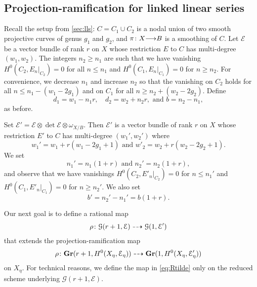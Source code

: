 \documentclass[11pt,reqno]{amsart}
\theoremstyle{plain}
\theoremstyle{definition}
\theoremstyle{remark}
\numberwithin{equation}{section}
\renewcommand{\to}{{\longrightarrow}}
\numberwithin{equation}{section}
\begin{document}
\subsection{Projection-ramification for linked linear series}
\label{sec:prlls}
Recall the setup from \autoref{sec:lls}: $C = C_1 \cup C_2$ is a nodal union of two smooth projective curves of genus $g_1$ and $g_2$, and $\pi \from X \to B$ is a smoothing of $C$.
Let $\mathcal E$ be a vector bundle of rank $r$ on $X$ whose restriction $E$ to $C$ has multi-degree $(w_1, w_2)$.
The integers $n_2 \geq n_1$ are such that we have vanishing $H^0(C_2, E_n|_{C_2}) = 0$ for all $n \leq n_1$ and $H^0(C_1, E_n|_{C_1}) = 0$ for $n \geq n_2$.
For convenience, we decrease $n_1$ and increase $n_2$ so that the vanishing on $C_2$ holds for all $n \leq n_1 - (w_1-2g_1)$ and on $C_1$ for all $n \geq n_2 + (w_2-2g_2)$.
Define
\[ d_1 = w_1 - n_1r, \quad d_2 = w_2 + n_2r,\text{ and } b = n_2 - n_1,\]
as before.

Set $\mathcal E' = \mathcal E \otimes \det \mathcal E \otimes \omega_{X/B}$.
Then $\mathcal E'$ is a vector bundle of rank $r$ on $X$ whose restriction $E'$ to $C$ has multi-degree $(w_1', w_2')$ where
\[ w_1' = w_1 + r(w_1-2g_1+1) \text{ and } w'_2 = w_2 + r(w_2-2g_2+1).\]
We set
\[ n_1' = n_1(1+r) \text{ and } n_2' = n_2(1+r),\]
and observe that we have vanishings $H^0(C_2, E'_{n}|_{C_2}) = 0$ for $n \leq n_1'$ and $H^0(C_1, E'_{n}|_{C_1}) = 0$ for $n \geq n_2'$.
We also set
\[ b' = n_2' - n_1' = b(1+r).\]

Our next goal is to define a rational map
\begin{equation}\label{eq:Rtilde}
  \rho {\colon} {\mathcal G}(r+1, \mathcal E) \dashrightarrow {\mathcal G}(1, \mathcal E')
\end{equation}
that extends the projection-ramification map
\[
  \rho {\colon} {\bf Gr}(r+1, H^0(X_\eta, \mathcal E_\eta)) \dashrightarrow {\bf Gr}(1, H^0(X_\eta, \mathcal E'_\eta))
\]
on $X_\eta$.
For technical reasons, we define the map in \eqref{eq:Rtilde} only on the reduced scheme underlying ${\mathcal G}(r+1, \mathcal E)$.
\end{document}

